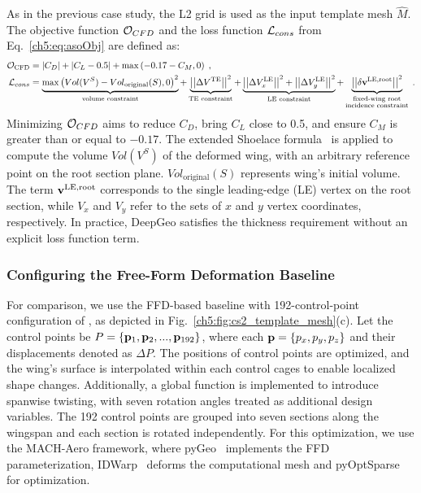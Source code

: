 As in the previous case study, the L2 grid is used as the input template mesh $\hat{M}$.
The objective function $\mathcal{O}_{CFD}$ and the loss function $\mathcal{L}_{cons}$ from Eq.~\ref{ch5:eq:asoObj} are defined as:
%
\begin{align}
    \mathcal{O}_\text{CFD} & = \left| C_D \right| + \left| C_L-0.5 \right| + \max \left( -0.17 - C_M, 0 \right) \;, \label{ch5:eq:cfdWing}  \\
    \mathcal{L}_{cons} & = 
    \underbrace{{\max \left(Vol(V^S)-{Vol}_\text{original}(S), 0\right)} ^2}_\text{volume constraint} + 
    \underbrace{\left|\left|\Delta V^\text{TE}\right|\right|^2}_\text{TE constraint} +
    \underbrace{\left|\left|\Delta V^\text{LE}_x\right|\right|^2 + \left|\left|\Delta V^\text{LE}_y\right|\right|^2}_\text{LE constraint} +
    \underbrace{\left|\left|\delta \mathbf{v}^\text{LE,root}\right|\right|^2}_{ \substack{\text{fixed-wing root}\\ \text{incidence constraint}} } \; . \nonumber
\end{align}
%
Minimizing $\mathcal{O}_{CFD}$ aims to reduce $C_D$, bring $C_L$ close to 0.5, and ensure $C_M$ is greater than or equal to $-0.17$.  The extended Shoelace formula~\cite{aa.Zhang2001} is applied to compute the volume $Vol(V^S)$ of the deformed wing, with an arbitrary reference point on the root section plane. ${Vol}_\text{original}(S)$ represents wing's initial volume. The term $\mathbf{v}^\text{LE,root}$ corresponds to the single leading-edge (LE) vertex on the root section, while $V_x$ and $V_y$ refer to the sets of $x$ and $y$ vertex coordinates, respectively. In practice, DeepGeo satisfies the thickness requirement without an explicit loss function term.



\subsubsection{Configuring the Free-Form Deformation Baseline}

For comparison, we use the FFD-based baseline with 192-control-point configuration of \citet{aa.Hwang2019,aa.Li2019}, as depicted in Fig.~\ref{ch5:fig:cs2_template_mesh}(c). Let the control points be $P=\{\mathbf{p}_1, \mathbf{p}_2,..., \mathbf{p}_{192}\}$, where each $\mathbf{p}=\{p_x, p_y, p_z\}$ and their displacements denoted as $\Delta P$. The positions of control points are optimized, and the wing's surface is interpolated within each control cages to enable localized shape changes. Additionally, a global function is implemented to introduce spanwise twisting, with seven rotation angles treated as additional design variables.
The 192 control points are grouped into seven sections along the wingspan and each section is rotated independently.
For this optimization, we use the MACH-Aero framework, where pyGeo~\cite{aa.Kenway2010} implements the FFD parameterization, IDWarp~\cite{aa.Secco2021} deforms the computational mesh and pyOptSparse~\cite{aa.Wu2020} for optimization.

